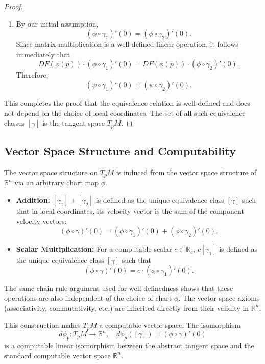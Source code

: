 \documentclass[12pt, a4paper]{article}
\begin{document}
\begin{proof}
\begin{enumerate}
    \item By our initial assumption,
    \[
    (\phi \circ \gamma_1)'(0) = (\phi \circ \gamma_2)'(0).
    \]
    Since matrix multiplication is a well-defined linear operation, it follows immediately that
    \[
    DF(\phi(p)) \cdot (\phi \circ \gamma_1)'(0) = DF(\phi(p)) \cdot (\phi \circ \gamma_2)'(0).
    \]
    Therefore,
    \[
    (\psi \circ \gamma_1)'(0) = (\psi \circ \gamma_2)'(0).
    \]
\end{enumerate}

This completes the proof that the equivalence relation is well-defined and does not depend on the choice of local coordinates. The set of all such equivalence classes $[\gamma]$ is the tangent space $T_p M$.
\end{proof}

\subsection*{Vector Space Structure and Computability}

The vector space structure on $T_p M$ is induced from the vector space structure of $\mathbb{R}^n$ via an arbitrary chart map $\phi$.

\begin{itemize}
    \item \textbf{Addition:} $[\gamma_1] + [\gamma_2]$ is defined as the unique equivalence class $[\gamma]$ such that in local coordinates, its velocity vector is the sum of the component velocity vectors:
    \[
    (\phi \circ \gamma)'(0) = (\phi \circ \gamma_1)'(0) + (\phi \circ \gamma_2)'(0).
    \]
    \item \textbf{Scalar Multiplication:} For a computable scalar $c \in \mathbb{R}_c$, $c [\gamma_1]$ is defined as the unique equivalence class $[\gamma]$ such that
    \[
    (\phi \circ \gamma)'(0) = c \cdot (\phi \circ \gamma_1)'(0).
    \]
\end{itemize}

The same chain rule argument used for well-definedness shows that these operations are also independent of the choice of chart $\phi$. The vector space axioms (associativity, commutativity, etc.) are inherited directly from their validity in $\mathbb{R}^n$.

This construction makes $T_p M$ a computable vector space. The isomorphism
\[
d \phi_p : T_p M \to \mathbb{R}^n, \quad d \phi_p([\gamma]) = (\phi \circ \gamma)'(0)
\]
is a computable linear isomorphism between the abstract tangent space and the standard computable vector space $\mathbb{R}^n$.
\end{document}
